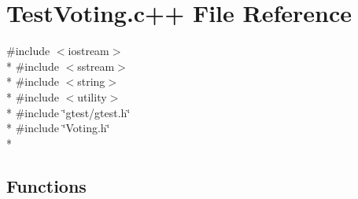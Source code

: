 \hypertarget{TestVoting_8c_09_09}{\section{Test\-Voting.\-c++ File Reference}
\label{TestVoting_8c_09_09}
}
{\ttfamily \#include $<$iostream$>$}\\*
{\ttfamily \#include $<$sstream$>$}\\*
{\ttfamily \#include $<$string$>$}\\*
{\ttfamily \#include $<$utility$>$}\\*
{\ttfamily \#include \char`\"{}gtest/gtest.\-h\char`\"{}}\\*
{\ttfamily \#include \char`\"{}Voting.\-h\char`\"{}}\\*
\subsection*{Functions}
